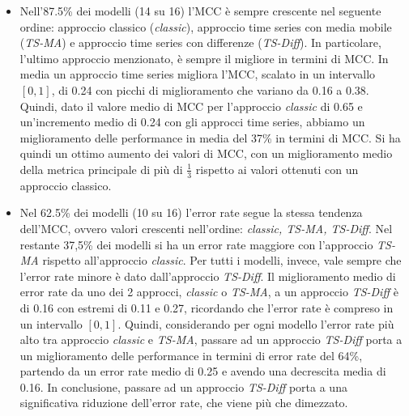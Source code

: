 \begin{itemize}

    \item Nell'87.5\% dei modelli (14 su 16) l'MCC \`e sempre crescente nel seguente ordine: approccio classico (\textit{classic}), approccio time series con media mobile (\textit{TS-MA}) e approccio time series con differenze (\textit{TS-Diff}). In particolare, l'ultimo approccio menzionato, \`e sempre il migliore in termini di MCC. In media un approccio time series migliora l'MCC, scalato in un intervallo $[0,1]$, di 0.24 con picchi di miglioramento che variano da 0.16 a 0.38. Quindi, dato il valore medio di MCC per l'approccio \textit{classic} di 0.65 e un'incremento medio di 0.24 con gli approcci time series, abbiamo un miglioramento delle performance in media del 37\% in termini di MCC. Si ha quindi un ottimo aumento dei valori di MCC, con un miglioramento medio della metrica principale di pi\`u di $\frac{1}{3}$ rispetto ai valori ottenuti con un approccio classico.

    \item Nel 62.5\% dei modelli (10 su 16) l'error rate segue la stessa tendenza dell'MCC, ovvero valori crescenti nell'ordine: \textit{classic, TS-MA, TS-Diff}. Nel restante 37,5\% dei modelli si ha un error rate maggiore con l'approccio \textit{TS-MA} rispetto all'approccio \textit{classic}. Per tutti i modelli, invece, vale sempre che l'error rate minore \`e dato dall'approccio \textit{TS-Diff}. Il miglioramento medio di error rate da uno dei 2 approcci, \textit{classic} o \textit{TS-MA}, a un approccio \textit{TS-Diff} \`e di 0.16 con estremi di 0.11 e 0.27, ricordando che l'error rate \`e compreso in un intervallo $[0,1]$. Quindi, considerando per ogni modello l'error rate pi\`u alto tra approccio \textit{classic} e \textit{TS-MA}, passare ad un approccio \textit{TS-Diff} porta a un miglioramento delle performance in termini di error rate del 64\%, partendo da un error rate medio di 0.25 e avendo una decrescita media di 0.16. In conclusione, passare ad un approccio \textit{TS-Diff} porta a una significativa riduzione dell'error rate, che viene pi\`u che dimezzato.






\end{itemize}
